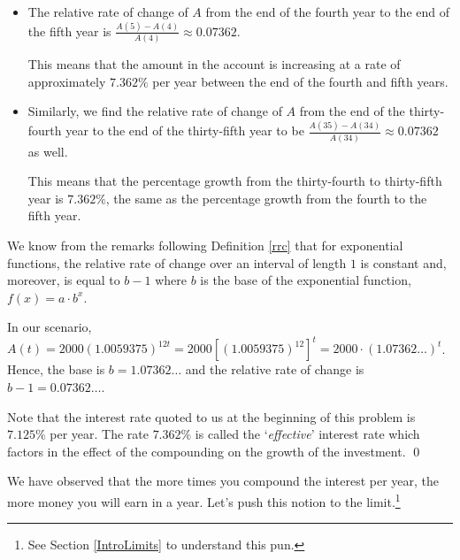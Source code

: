 \documentclass{ximera}
\begin{document}
\begin{ex}
\begin{enumerate}
\begin{itemize}

\item  The relative rate of change of $A$ from the end of the fourth year to the end of the fifth year is $\frac{A(5)-A(4)}{A(4)} \approx 0.07362$. 

\smallskip

This means that the amount in the account is increasing at a rate of approximately $7.362 \%$ per year between the end of the fourth and fifth years.

\item Similarly, we find the relative rate of change of $A$ from the end  of the thirty-fourth year to the end of the thirty-fifth year to be $\frac{A(35)-A(34)}{A(34)} \approx  0.07362$ as well.  

This means that the percentage growth from the thirty-fourth to thirty-fifth year is $7.362 \%$, the same as the percentage growth from the fourth to the fifth year.

\end{itemize}

We know from the remarks following Definition \ref{rrc} that for exponential functions, the relative rate of change over an interval of length $1$ is constant and, moreover, is equal to $b-1$ where $b$ is the base of the exponential function, $f(x) = a \cdot b^{x}$.  

\smallskip

In our scenario,  $A(t) = 2000 (1.0059375)^{12t} = 2000  \left[(1.0059375)^{12}\right]^{t} = 2000 \cdot (1.07362 \ldots)^t$.  Hence, the base is $b = 1.07362 \ldots$ and the relative rate of change is $b-1 = 0.07362 \ldots$.    

\smallskip

Note that the interest rate quoted to us at the beginning of this problem is $7.125 \%$ per year.  The rate $7.362 \%$ is called the `\textit{effective}' interest rate which factors in the effect of the compounding on the growth of the investment. \qed

\end{enumerate}

\end{ex}

We have observed that the more times you compound the interest per year, the more money you will earn in a year.  Let's push this notion to the limit.\footnote{See Section \ref{IntroLimits} to understand this pun.}  

\smallskip
\end{document}
